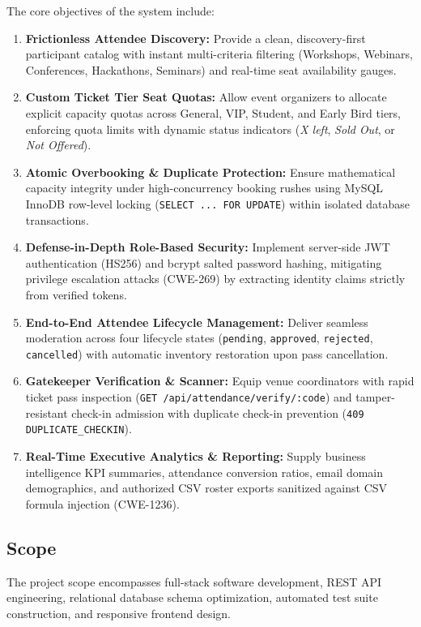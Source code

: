 \documentclass[11pt,a4paper]{article}
\begin{document}
The core objectives of the system include:
\begin{enumerate}[leftmargin=*]
    \item \textbf{Frictionless Attendee Discovery:} Provide a clean, discovery-first participant catalog with instant multi-criteria filtering (Workshops, Webinars, Conferences, Hackathons, Seminars) and real-time seat availability gauges.
    \item \textbf{Custom Ticket Tier Seat Quotas:} Allow event organizers to allocate explicit capacity quotas across General, VIP, Student, and Early Bird tiers, enforcing quota limits with dynamic status indicators (\textit{X left}, \textit{Sold Out}, or \textit{Not Offered}).
    \item \textbf{Atomic Overbooking \& Duplicate Protection:} Ensure mathematical capacity integrity under high-concurrency booking rushes using MySQL InnoDB row-level locking (\texttt{SELECT ... FOR UPDATE}) within isolated database transactions.
    \item \textbf{Defense-in-Depth Role-Based Security:} Implement server-side JWT authentication (HS256) and bcrypt salted password hashing, mitigating privilege escalation attacks (CWE-269) by extracting identity claims strictly from verified tokens.
    \item \textbf{End-to-End Attendee Lifecycle Management:} Deliver seamless moderation across four lifecycle states (\texttt{pending}, \texttt{approved}, \texttt{rejected}, \texttt{cancelled}) with automatic inventory restoration upon pass cancellation.
    \item \textbf{Gatekeeper Verification \& Scanner:} Equip venue coordinators with rapid ticket pass inspection (\texttt{GET /api/attendance/verify/:code}) and tamper-resistant check-in admission with duplicate check-in prevention (\texttt{409 DUPLICATE\_CHECKIN}).
    \item \textbf{Real-Time Executive Analytics \& Reporting:} Supply business intelligence KPI summaries, attendance conversion ratios, email domain demographics, and authorized CSV roster exports sanitized against CSV formula injection (CWE-1236).
\end{enumerate}

\vspace{0.10in}
\subsection*{Scope}
\justifying

The project scope encompasses full-stack software development, REST API engineering, relational database schema optimization, automated test suite construction, and responsive frontend design.
\end{document}
